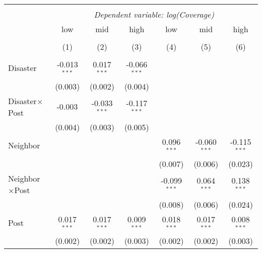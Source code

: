 
\begin{tabular}{@{\extracolsep{5pt}}lcccccc}
\\[-1.8ex]\hline
\hline \\[-1.8ex]
& \multicolumn{6}{c}{\textit{Dependent variable: log(Coverage)}} \
\cr \cline{2-7}
\\[-1.8ex] & \multicolumn{1}{c}{low} & \multicolumn{1}{c}{mid} & \multicolumn{1}{c}{high} & \multicolumn{1}{c}{low} & \multicolumn{1}{c}{mid} & \multicolumn{1}{c}{high}  \\
\\[-1.8ex] & (1) & (2) & (3) & (4) & (5) & (6) \\
\hline \\[-1.8ex]
 Disaster & -0.013$^{***}$ & 0.017$^{***}$ & -0.066$^{***}$ & & & \\
& (0.003) & (0.002) & (0.004) & & & \\
 Disaster$\times$Post & -0.003$^{}$ & -0.033$^{***}$ & -0.117$^{***}$ & & & \\
& (0.004) & (0.003) & (0.005) & & & \\
 Neighbor & & & & 0.096$^{***}$ & -0.060$^{***}$ & -0.115$^{***}$ \\
& & & & (0.007) & (0.006) & (0.023) \\
 Neighbor$\times$Post & & & & -0.099$^{***}$ & 0.064$^{***}$ & 0.138$^{***}$ \\
& & & & (0.008) & (0.006) & (0.024) \\
 Post & 0.017$^{***}$ & 0.017$^{***}$ & 0.009$^{***}$ & 0.018$^{***}$ & 0.017$^{***}$ & 0.008$^{***}$ \\
& (0.002) & (0.002) & (0.003) & (0.002) & (0.002) & (0.003) \\

\end{tabular}
